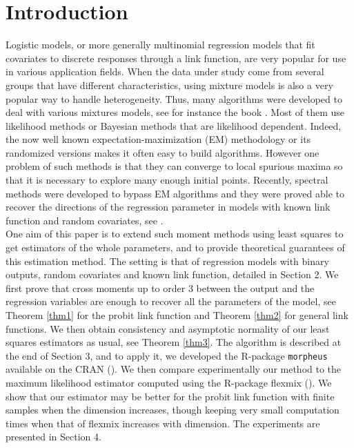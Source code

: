 \section{Introduction}


Logistic models, or  more generally multinomial regression models that fit covariates to discrete responses through a link function, are very popular for use in various application fields. When the data under study come from several groups that have different characteristics, using mixture models is also a very popular way to handle heterogeneity. Thus, many algorithms were developed to deal with various mixtures models, see for instance the book \cite{MR2265601}. Most of them use likelihood methods or Bayesian methods that are likelihood dependent. Indeed, the now well known  expectation-maximization (EM) methodology or its randomized versions makes it often  easy to build algorithms.
However one problem of such methods is that they can converge to local  spurious maxima so that it is necessary to explore many enough initial points. Recently, spectral methods were developed to bypass EM algorithms and they were proved able to recover the directions of the regression parameter in models with known link function and random covariates, see \cite{AK2014b}. \\

One aim of this paper is to extend such moment methods using least squares to get estimators of the whole parameters, and to provide theoretical guarantees of this estimation method. The setting is that of regression models with binary outputs, random covariates and known link function, detailed in Section 2. We first prove that cross moments up to order $3$  between the output and the regression variables are enough to recover all the parameters of the model, see Theorem \ref{thm1} for the probit link function and Theorem \ref{thm2} for general link functions. We then obtain consistency and asymptotic normality of our least squares estimators as usual, see Theorem \ref{thm3}. The algorithm is described at the end of Section 3, and to apply it, we developed  the R-package \verb"morpheus" available on the CRAN (\cite{Loum_Auder}).
We then compare experimentally our method to the maximum likelihood estimator computed using the R-package flexmix (\cite{bg-papers:Gruen+Leisch:2007a}). We show that our estimator may be better for the probit link function with finite samples when the dimension increases,  though keeping very small computation times  when that of flexmix increases with dimension. The experiments are presented in Section 4.\\

